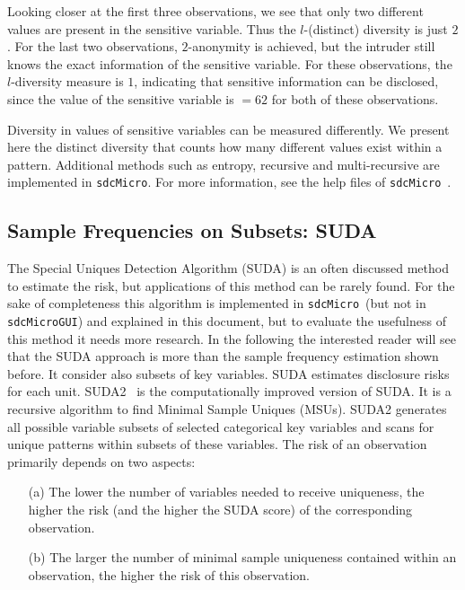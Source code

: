 \documentclass[12pt]{scrartcl}\usepackage[]{graphicx}\usepackage[]{color}
\newcommand{\sdcMicro}{\texttt{sdcMicro}}
\newcommand{\sdcMicroGUI}{\texttt{sdcMicroGUI}}
\begin{document}
Looking closer at the first three observations, we see that only two different values are present in the sensitive variable. Thus the $l$-(distinct) diversity is just $2$. For the last two observations, $2$-anonymity is achieved, but the intruder still knows the exact information of the sensitive variable. For these observations, the $l$-diversity measure is $1$, indicating that sensitive information can be disclosed, since the value of the sensitive variable is $= 62$ for both of these observations.

Diversity in values of sensitive variables can be measured differently. We present here the distinct diversity that counts how many different values exist within a pattern. Additional methods such as entropy, recursive and multi-recursive are implemented in \sdcMicro . For more information, see the help files of \sdcMicro \ \citep{sdcMicro}.

\subsection{Sample Frequencies on Subsets: SUDA}\label{method:suda}
The Special Uniques Detection Algorithm (SUDA) is an often discussed method to estimate the risk, but  applications of this method can be rarely found. For the sake of completeness this algorithm is implemented in \sdcMicro \ (but not in \sdcMicroGUI ) and explained in this document, but to evaluate the usefulness of this method it needs more research. In the following the interested reader will see that the SUDA approach is more than the sample frequency estimation shown before. It consider also subsets of key variables. SUDA estimates disclosure risks for each unit. SUDA2~\citep[e.g.,][]{manning08} is the computationally improved version of SUDA. It is a recursive algorithm to find Minimal Sample Uniques (MSUs). SUDA2 generates all possible variable subsets of selected categorical key variables and scans for unique patterns within subsets of these variables. The risk of an observation primarily depends on two aspects:

\begin{itemize}
\item[(a)] The lower the number of variables needed to receive uniqueness, the higher the risk (and the higher the SUDA score) of the corresponding observation.
\item[(b)] The larger the number of minimal sample uniqueness contained within an observation, the higher the risk of this observation.
\end{itemize}
\end{document}
